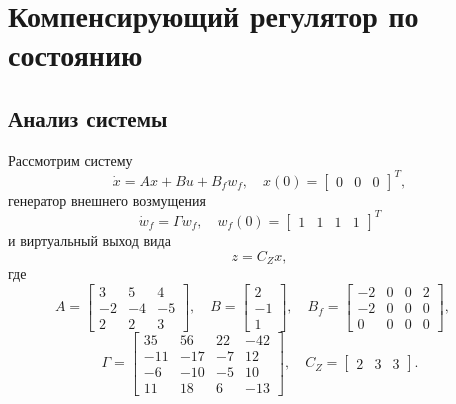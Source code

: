 \section{Компенсирующий регулятор по состоянию}
\subsection{Анализ системы}
Рассмотрим систему 
\begin{equation}
    \dot x=Ax+Bu+B_fw_f,\quad x(0)=\begin{bmatrix}
        0&0&0
    \end{bmatrix}^T,
    \label{eq:sys1}
\end{equation}
генератор внешнего возмущения
\begin{equation*}
    \dot w_f=\Gamma w_f,\quad w_f(0)=\begin{bmatrix}
        1&1&1&1
    \end{bmatrix}^T
\end{equation*}
и виртуальный выход вида
\begin{equation*}
    z=C_Zx,
\end{equation*}
где
\begin{equation*}
    A=\begin{bmatrix}
        3&5&4\\
        -2&-4&-5\\
        2&2&3
    \end{bmatrix},\quad
    B=\begin{bmatrix}
        2\\-1\\1
    \end{bmatrix},\quad
    B_f=\begin{bmatrix}
        -2&0&0&2\\
        -2&0&0&0\\
        0&0&0&0
    \end{bmatrix},\quad
\end{equation*}
\begin{equation*}
    \Gamma=\begin{bmatrix}
        35&56&22&-42\\
        -11&-17&-7&12\\
        -6&-10&-5&10\\
        11&18&6&-13
    \end{bmatrix},\quad
    C_Z=\begin{bmatrix}
        2&3&3
    \end{bmatrix}.
\end{equation*}
